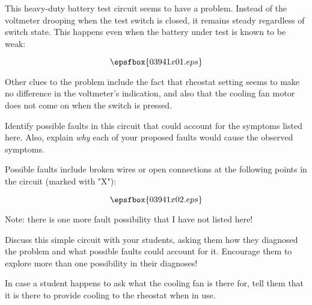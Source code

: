 

This heavy-duty battery test circuit seems to have a problem.  Instead of the voltmeter drooping when the test switch is closed, it remains steady regardless of switch state.  This happens even when the battery under test is known to be weak:

$$\epsfbox{03941x01.eps}$$

Other clues to the problem include the fact that rheostat setting seems to make no difference in the voltmeter's indication, and also that the cooling fan motor does not come on when the switch is pressed.

Identify possible faults in this circuit that could account for the symptoms listed here.  Also, explain {\it why} each of your proposed faults would cause the observed symptoms.







Possible faults include broken wires or open connections at the following points in the circuit (marked with "X"):

$$\epsfbox{03941x02.eps}$$

Note: there is one more fault possibility that I have not listed here!







Discuss this simple circuit with your students, asking them how they diagnosed the problem and what possible faults could account for it.  Encourage them to explore more than one possibility in their diagnoses!

In case a student happens to ask what the cooling fan is there for, tell them that it is there to provide cooling to the rheostat when in use.




